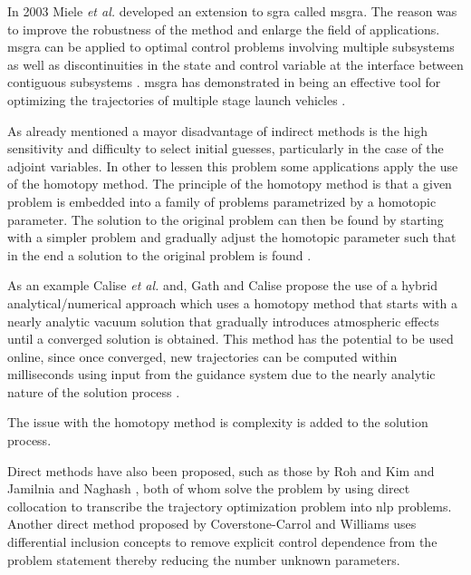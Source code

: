 In 2003 Miele \emph{et al.} developed an extension to \acrshort{sgra} called \acrfull{msgra}. The reason was to improve the robustness of the method and enlarge the field of applications. \acrshort{msgra} can be applied to optimal control problems involving multiple subsystems as well as discontinuities in the state and control variable at the interface between contiguous subsystems \cite{miele2003multiplep1}. \acrshort{msgra} has demonstrated in being an effective tool for optimizing the trajectories of multiple stage launch vehicles \cite{miele2003multiplep2}.

As already mentioned a mayor disadvantage of indirect methods is the high sensitivity and difficulty to select initial guesses, particularly in the case of the adjoint variables. In other to lessen this problem some applications apply the use of the homotopy method. The principle of the homotopy method is that a given problem is embedded into a family of problems parametrized by a homotopic parameter. The solution to the original problem can then be found by starting with a simpler problem and gradually adjust the homotopic parameter such that in the end a solution to the original problem is found \cite{pan2016double}.

As an example Calise \emph{et al.} \cite{calise2000further} and, Gath and Calise \cite{gath2001optimization} propose the use of a hybrid analytical/numerical approach which uses a homotopy method that starts with a nearly analytic vacuum solution that gradually introduces atmospheric effects until a converged solution is obtained. This method has the potential to be used online, since once converged, new trajectories can be computed within milliseconds using input from the guidance system due to the nearly analytic nature of the solution process \cite{gath2001optimization}. 

The issue with the homotopy method is complexity is added to the solution process.

Direct methods have also been proposed, such as those by Roh and Kim \cite{roh2002trajectory} and Jamilnia and Naghash \cite{jamilnia2012simultaneous}, both of whom solve the problem by using direct collocation to transcribe the trajectory optimization problem into \acrfull{nlp} problems. Another direct method proposed by Coverstone-Carrol and Williams \cite{coverstone1994optimal} uses differential inclusion concepts to remove explicit control dependence from the problem statement thereby reducing the number unknown parameters.

